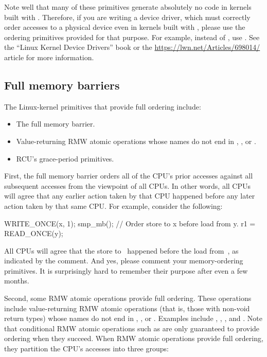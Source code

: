 Note well that many of these primitives generate absolutely no code
in kernels built with .
Therefore, if you are writing a device driver, which must correctly
order accesses to a physical device even in kernels built with
, please use the ordering primitives provided for
that purpose.
For example, instead of , use .
See the ``Linux Kernel Device Drivers'' book or the
\url{https://lwn.net/Articles/698014/} article for more information.


\subsection{Full memory barriers}

The Linux-kernel primitives that provide full ordering include:

\begin{itemize}
 \item	The  full memory barrier.

 \item	Value-returning RMW atomic operations whose names do not end in
	, , or .

 \item	RCU's grace-period primitives.
\end{itemize}

First, the  full memory barrier orders all of the CPU's prior
accesses against all subsequent accesses from the viewpoint of all CPUs.
In other words, all CPUs will agree that any earlier action taken
by that CPU happened before any later action taken by that same CPU\@.
For example, consider the following:

\begin{VerbatimU}
	WRITE_ONCE(x, 1);
	smp_mb(); // Order store to x before load from y.
	r1 = READ_ONCE(y);
\end{VerbatimU}

All CPUs will agree that the store to~ happened before the load
from~, as indicated by the comment.
And yes, please comment your memory-ordering primitives.
It is surprisingly hard to remember their purpose after even a few months.

Second, some RMW atomic operations provide full ordering.
These operations include value-returning RMW atomic operations
(that is, those with non-void return types) whose names do not end in
, , or .
Examples include , ,
, and .
Note that conditional RMW atomic operations such as  are
only guaranteed to provide ordering when they succeed.
When RMW atomic operations provide full ordering, they partition the
CPU's accesses into three groups:

